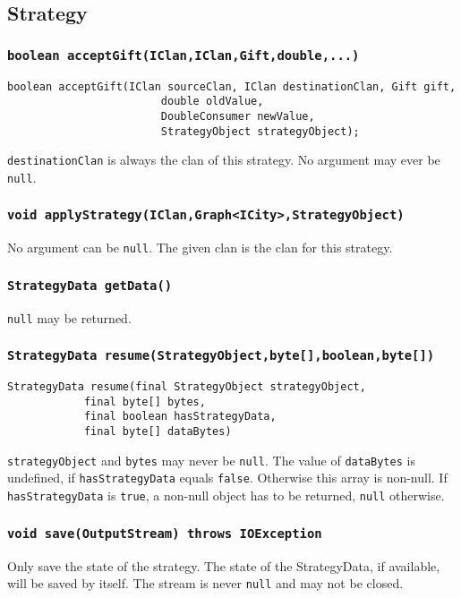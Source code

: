 \documentclass{article}
\begin{document}
\subsection{Strategy}

\subsubsection{\texttt{boolean acceptGift(IClan,IClan,Gift,double,...)}}
\begin{verbatim}
boolean acceptGift(IClan sourceClan, IClan destinationClan, Gift gift,
                        double oldValue,
                        DoubleConsumer newValue,
                        StrategyObject strategyObject);
\end{verbatim}
\texttt{destinationClan} is always the clan of this strategy. No argument may ever be \texttt{null}.

\subsubsection{\texttt{void applyStrategy(IClan,Graph<ICity>,StrategyObject)}}
No argument can be \texttt{null}. The given clan is the clan for this strategy.

\subsubsection{\texttt{StrategyData getData()}}
\texttt{null} may be returned.

\subsubsection{\texttt{StrategyData resume(StrategyObject,byte[],boolean,byte[])}}
\begin{verbatim}
StrategyData resume(final StrategyObject strategyObject,
			final byte[] bytes,
			final boolean hasStrategyData,
			final byte[] dataBytes)
\end{verbatim}
\texttt{strategyObject} and \texttt{bytes} may never be \texttt{null}.
The value of \texttt{dataBytes} is undefined, if \texttt{hasStrategyData} equals \texttt{false}.
Otherwise this array is non-null.
If \texttt{hasStrategyData} is \texttt{true}, a non-null object has to be returned, \texttt{null} otherwise.

\subsubsection{\texttt{void save(OutputStream) throws IOException}}
Only save the state of the strategy. The state of the StrategyData, if available, will be saved by itself.
The stream is never \texttt{null} and may not be closed.
\end{document}
